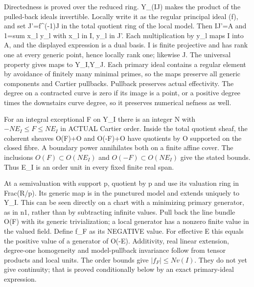 \documentclass[11pt]{article}
\begin{document}
Directedness is proved over the reduced ring. Y\_(IJ) makes the product of the pulled-back ideals invertible. Locally write it as the regular principal ideal (f), and set J'=f\textasciicircum{}(-1)J in the total quotient ring of the local model. Then IJ'=A and 1=sum x\_l y\_l with x\_l in I, y\_l in J'. Each multiplication by y\_l maps I into A, and the displayed expression is a dual basis. I is finite projective and has rank one at every generic point, hence locally rank one; likewise J. The universal property gives maps to Y\_I,Y\_J. Each primary ideal contains a regular element by avoidance of finitely many minimal primes, so the maps preserve all generic components and Cartier pullbacks. Pullback preserves actual effectivity. The degree on a contracted curve is zero if its image is a point, or a positive degree times the downstairs curve degree, so it preserves numerical nefness as well.

For an integral exceptional F on Y\_I there is an integer N with \(-NE_I\le F\le NE_I\) in ACTUAL Cartier order. Inside the total quotient sheaf, the coherent sheaves O(F)+O and O(-F)+O have quotients by O supported on the closed fibre. A boundary power annihilates both on a finite affine cover. The inclusions \(O(F)\subset O(NE_I)\) and \(O(-F)\subset O(NE_I)\) give the stated bounds. Thus E\_I is an order unit in every fixed finite real span.

At a semivaluation with support p, quotient by p and use its valuation ring in Frac(R/p). Its generic map is in the punctured model and extends uniquely to Y\_I. This can be seen directly on a chart with a minimizing primary generator, as in n1, rather than by subtracting infinite values. Pull back the line bundle O(F) with its generic trivialization; a local generator has a nonzero finite value in the valued field. Define f\_F as its NEGATIVE value. For effective E this equals the positive value of a generator of O(-E). Additivity, real linear extension, degree-one homogeneity and model-pullback invariance follow from tensor products and local units. The order bounds give \(|f_F|\le N v(I)\). They do not yet give continuity; that is proved conditionally below by an exact primary-ideal expression.
\end{document}
